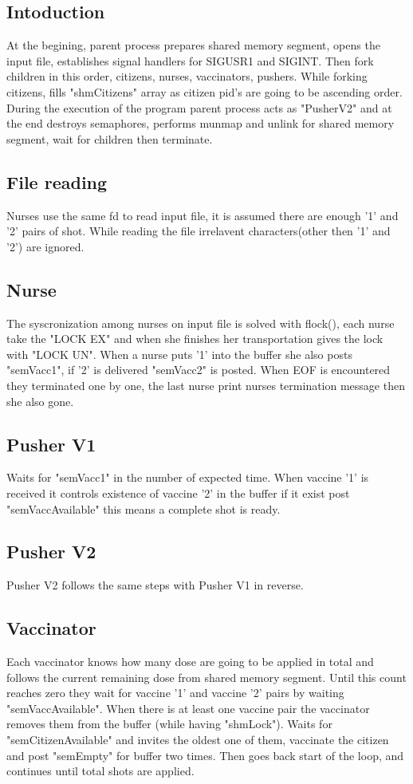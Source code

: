 \documentclass{article}
\begin{document}
\subsection*{Intoduction}
    At the begining, parent process prepares shared memory segment, opens the input file, establishes signal handlers for SIGUSR1 and SIGINT. Then fork children in this order, citizens, nurses, vaccinators, pushers.
    While forking citizens, fills "shmCitizens" array as citizen pid's are going to be ascending order.  
    During the execution of the program parent process acts as "PusherV2" and at the end destroys semaphores, performs munmap and unlink for shared memory segment, wait for children then terminate.

\subsection*{File reading}
    Nurses use the same fd to read input file, it is assumed there are enough '1' and '2' pairs of shot. While reading the file irrelavent characters(other then '1' and '2') are ignored. 

\subsection*{Nurse}
    The syscronization among nurses on input file is solved with flock(), each nurse take the "LOCK EX" and when she finishes her transportation gives the lock with "LOCK UN". 
    When a nurse puts '1' into the buffer she also posts "semVacc1", if '2' is delivered "semVacc2" is posted.
    When EOF is encountered they terminated one by one, the last nurse print nurses termination message then she also gone.
    
\subsection*{Pusher V1}
    Waits for "semVacc1" in the number of expected time. When vaccine '1' is received it controls existence of vaccine '2' in the buffer if it exist post "semVaccAvailable" this means a complete shot is ready. 
    
\subsection*{Pusher V2}
    Pusher V2 follows the same steps with Pusher V1 in reverse. 

\subsection*{Vaccinator}
    Each vaccinator knows how many dose are going to be applied in total and follows the current remaining dose from shared memory segment. Until this count reaches zero they wait for vaccine '1' and vaccine '2' pairs by waiting "semVaccAvailable". When there is at least one vaccine pair the vaccinator removes them from the buffer (while having "shmLock"). Waits for "semCitizenAvailable" and invites the oldest one of them, vaccinate the citizen and post "semEmpty" for buffer two times. Then goes back start of the loop, and continues until total shots are applied.
\end{document}
